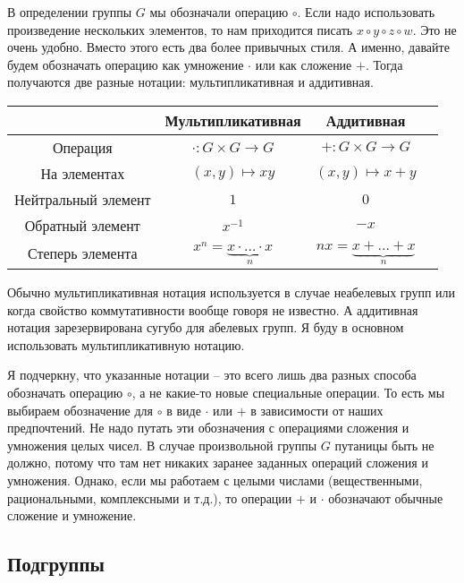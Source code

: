 В определении группы $G$ мы обозначали операцию $\circ$.
Если надо использовать произведение нескольких элементов, то нам приходится писать $x \circ y \circ z \circ w$.
Это не очень удобно.
Вместо этого есть два более привычных стиля.
А именно, давайте будем обозначать операцию как умножение $\cdot$ или как сложение $+$.
Тогда получаются две разные нотации: мультипликативная и аддитивная.
\begin{center}
\begin{tabular}{c|c|c|c}
{}&{Мультипликативная}&{Аддитивная}\\
\hline
{Операция}&{$\cdot \colon G\times G\to G$}&{$+\colon G\times G\to G$}\\
{На элементах}&{$(x, y)\mapsto xy$}&{$(x,y)\mapsto x+y$}\\
{Нейтральный элемент}&{$1$}&{$0$}\\
{Обратный элемент}&{$x^{-1}$}&{$-x$}\\
{Степерь элемента}&{$x^n = \underbrace{x \cdot\ldots \cdot x}_n$}&{$nx = \underbrace{x + \ldots + x}_n$}\\
\end{tabular}
\end{center}
Обычно мультипликативная нотация используется в случае неабелевых групп или когда свойство коммутативности вообще говоря не известно.
А аддитивная нотация зарезервирована сугубо для абелевых групп.
Я буду в основном использовать мультипликативную нотацию.

Я подчеркну, что указанные нотации -- это всего лишь два разных способа обозначать операцию $\circ$, а не какие-то новые специальные операции.
 То есть мы выбираем обозначение для $\circ$ в виде $\cdot$ или $+$ в зависимости от наших предпочтений.
Не надо путать эти обозначения с операциями сложения и умножения целых чисел.
В случае произвольной группы $G$ путаницы быть не должно, потому что там нет никаких заранее заданных операций сложения и умножения.
Однако, если мы работаем с целыми числами (вещественными, рациональными, комплексными и т.д.), то операции $+$ и $\cdot$ обозначают обычные сложение и умножение.

\subsection{Подгруппы}

